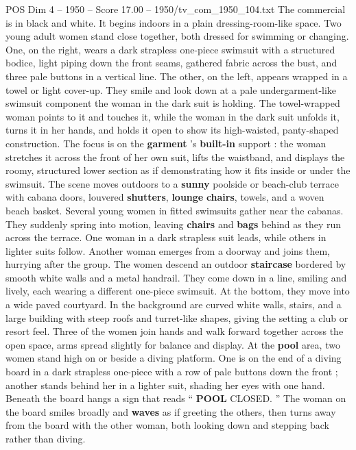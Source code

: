 \begin{textsample}{POS Dim 4 – 1950 – Score 17.00 – 1950/tv\_com\_1950\_104.txt}  \label{ex:f4_pos_033}
The commercial is in black and white.
It begins indoors in a plain dressing-room-like space.
Two young adult women stand close together, both dressed for swimming or changing.
One, on the right, wears a dark strapless one-piece swimsuit with a structured bodice, light piping down the front seams, gathered fabric across the bust, and three pale buttons in a vertical line.
The other, on the left, appears wrapped in a towel or light cover-up.
They smile and look down at a pale undergarment-like swimsuit component the woman in the dark suit is holding.
The towel-wrapped woman points to it and touches it, while the woman in the dark suit unfolds it, turns it in her hands, and holds it open to show its high-waisted, panty-shaped construction.
The focus is on the \textbf{garment} ’s \textbf{built-in} support : the woman stretches it across the front of her own suit, lifts the waistband, and displays the roomy, structured lower section as if demonstrating how it fits inside or under the swimsuit.
The scene moves outdoors to a \textbf{sunny} poolside or beach-club terrace with cabana doors, louvered \textbf{shutters}, \textbf{lounge} \textbf{chairs}, towels, and a woven beach basket.
Several young women in fitted swimsuits gather near the cabanas.
They suddenly spring into motion, leaving \textbf{chairs} and \textbf{bags} behind as they run across the terrace.
One woman in a dark strapless suit leads, while others in lighter suits follow.
Another woman emerges from a doorway and joins them, hurrying after the group.
The women descend an outdoor \textbf{staircase} bordered by smooth white walls and a metal handrail.
They come down in a line, smiling and lively, each wearing a different one-piece swimsuit.
At the bottom, they move into a wide paved courtyard.
In the background are curved white walls, stairs, and a large building with steep roofs and turret-like shapes, giving the setting a club or resort feel.
Three of the women join hands and walk forward together across the open space, arms spread slightly for balance and display.
At the \textbf{pool} area, two women stand high on or beside a diving platform.
One is on the end of a diving board in a dark strapless one-piece with a row of pale buttons down the front ; another stands behind her in a lighter suit, shading her eyes with one hand.
Beneath the board hangs a sign that reads “ \textbf{POOL} CLOSED. ” The woman on the board smiles broadly and \textbf{waves} as if greeting the others, then turns away from the board with the other woman, both looking down and stepping back rather than diving.

\end{textsample}
